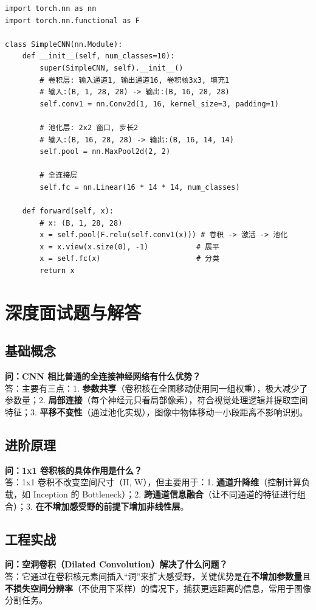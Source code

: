 \documentclass[12pt, a4paper]{article}
\begin{document}
\begin{lstlisting}
import torch.nn as nn
import torch.nn.functional as F

class SimpleCNN(nn.Module):
    def __init__(self, num_classes=10):
        super(SimpleCNN, self).__init__()
        # 卷积层: 输入通道1, 输出通道16, 卷积核3x3, 填充1
        # 输入:(B, 1, 28, 28) -> 输出:(B, 16, 28, 28)
        self.conv1 = nn.Conv2d(1, 16, kernel_size=3, padding=1)
        
        # 池化层: 2x2 窗口, 步长2
        # 输入:(B, 16, 28, 28) -> 输出:(B, 16, 14, 14)
        self.pool = nn.MaxPool2d(2, 2)
        
        # 全连接层
        self.fc = nn.Linear(16 * 14 * 14, num_classes)

    def forward(self, x):
        # x: (B, 1, 28, 28)
        x = self.pool(F.relu(self.conv1(x))) # 卷积 -> 激活 -> 池化
        x = x.view(x.size(0), -1)           # 展平
        x = self.fc(x)                      # 分类
        return x
\end{lstlisting}

\section{深度面试题与解答}
\subsection{基础概念}
\textbf{问：CNN 相比普通的全连接神经网络有什么优势？}\\
答：主要有三点：1. \textbf{参数共享}（卷积核在全图移动使用同一组权重），极大减少了参数量；2. \textbf{局部连接}（每个神经元只看局部像素），符合视觉处理逻辑并提取空间特征；3. \textbf{平移不变性}（通过池化实现），图像中物体移动一小段距离不影响识别。

\subsection{进阶原理}
\textbf{问：1x1 卷积核的具体作用是什么？}\\
答：1x1 卷积不改变空间尺寸（H, W），但主要用于：1. \textbf{通道升降维}（控制计算负载，如 Inception 的 Bottleneck）；2. \textbf{跨通道信息融合}（让不同通道的特征进行组合）；3. \textbf{在不增加感受野的前提下增加非线性层}。

\subsection{工程实战}
\textbf{问：空洞卷积（Dilated Convolution）解决了什么问题？}\\
答：它通过在卷积核元素间插入“洞”来扩大感受野，关键优势是在\textbf{不增加参数量}且\textbf{不损失空间分辨率}（不使用下采样）的情况下，捕获更远距离的信息，常用于图像分割任务。
\end{document}
